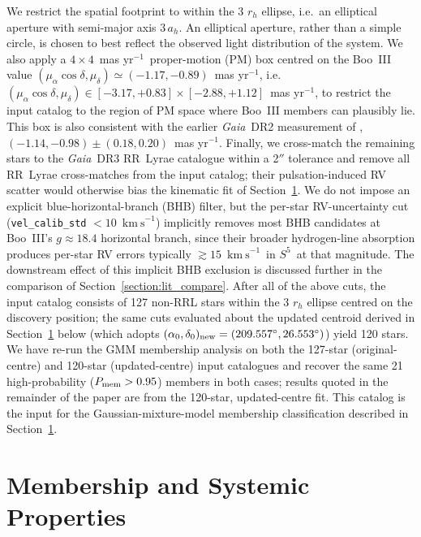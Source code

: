\documentclass[twocolumn, apj, numberedappendix, appendixfloats]{openjournal_dhayaa}
\newcommand{\SSSSS}{${S}^5$\xspace}
\newcommand{\gaia}{\textit{Gaia}\xspace}
\newcommand{\vlosUnits}{$\mathrm{km~s}^{-1}$\xspace}
\newcommand{\pmUnits}{mas yr$^{-1}$\xspace}
\begin{document}


We restrict the spatial footprint to within the 3 $r_h$ ellipse, i.e.\ an elliptical aperture with semi-major axis $3\,a_h$. An elliptical aperture, rather than a simple circle, is chosen to best reflect the observed light distribution of the system.
We also apply a $4\times 4$~\pmUnits\ proper-motion (PM) box centred on the \citet{Pace2022} Boo~III value $(\mu_\alpha\cos\delta, \mu_\delta) \simeq (-1.17, -0.89)$~\pmUnits, i.e.\ $(\mu_\alpha\cos\delta, \mu_\delta) \in [-3.17, +0.83] \times [-2.88, +1.12]$~\pmUnits, to restrict the input catalog to the region of PM space where Boo~III members can plausibly lie.  This box is also consistent with the earlier \gaia~DR2 measurement of \citet{Carlin2018}, $(-1.14, -0.98) \pm (0.18, 0.20)$~\pmUnits.
Finally, we cross-match the remaining stars to the \gaia\ DR3 RR~Lyrae catalogue \citep{GaiaRRL_reference} within a 2$''$ tolerance and remove all RR~Lyrae cross-matches from the input catalog; their pulsation-induced RV scatter would otherwise bias the kinematic fit of Section~\ref{section:membership}. We do not impose an explicit blue-horizontal-branch (BHB) filter, but the per-star RV-uncertainty cut (\texttt{vel\_calib\_std} $< 10$~\vlosUnits) implicitly removes most BHB candidates at Boo~III's $g \approx 18.4$ horizontal branch, since their broader hydrogen-line absorption produces per-star RV errors typically $\gtrsim 15$~\vlosUnits\ in \SSSSS\ at that magnitude. The downstream effect of this implicit BHB exclusion is discussed further in the \citet{Geha2026} comparison of Section~\ref{section:lit_compare}.
After all of the above cuts, the input catalog consists of 127 non-RRL stars within the 3 $r_h$ ellipse centred on the \citet{Grillmair2009} discovery position; the same cuts evaluated about the updated centroid derived in Section~\ref{section:membership} below (which adopts $(\alpha_0,\delta_0)_{\rm new} = (209.557^\circ, 26.553^\circ)$) yield 120 stars.  We have re-run the GMM membership analysis on both the 127-star (original-centre) and 120-star (updated-centre) input catalogues and recover the same 21 high-probability ($P_{\rm mem} > 0.95$) members in both cases; results quoted in the remainder of the paper are from the 120-star, updated-centre fit. This catalog is the input for the Gaussian-mixture-model membership classification described in Section~\ref{section:membership}.

\section{Membership and Systemic Properties} \label{section:membership}
\end{document}
